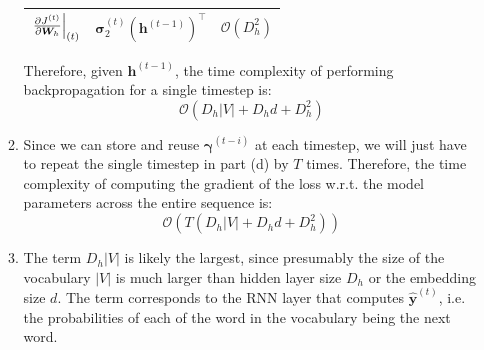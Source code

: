 \documentclass[10pt,reqno]{amsart}
\begin{document}
\begin{enumerate}[topsep=0pt,itemsep=3ex,partopsep=1ex,parsep=1ex]
\begin{enumerate}[itemsep=2ex]
\begin{center}
\begin{tabular}{|c|c|c|}
        $\left. \frac{\partial J^{(t)}}{\partial \bm{W}_h} \right\rvert_{(t)}$ & $\bm{\sigma}^{(t)}_2 \left(\bm{h}^{(t-1)}\right)^\top$ & $\mathcal{O}(D_h^2)$ \\
        \hline
      \end{tabular}
    \end{center}
    \vspace{1mm}
    Therefore, given $\bm{h}^{(t-1)}$, the time complexity of performing backpropagation
    for a single timestep is:
    \begin{equation*}
      \mathcal{O}(D_h |V| + D_h d + D_h^2)
    \end{equation*}
  \item Since we can store and reuse $\bm{\gamma}^{(t-i)}$ at each timestep, 
    we will just have to repeat the single timestep in part (d) by $T$ times. 
    Therefore, the time complexity of computing
    the gradient of the loss w.r.t. the model parameters across 
    the entire sequence is:
    \begin{equation*}
      \mathcal{O}(T(D_h |V| + D_h d + D_h^2))
    \end{equation*}
  \item The term $D_h |V|$ is likely the largest, since presumably the size of the 
    vocabulary $|V|$ is much larger than hidden layer size $D_h$ or the embedding size $d$.
    The term corresponds to the RNN layer 
    that computes $\bm{\hat{y}}^{(t)}$, i.e. the probabilities of each of the word in
    the vocabulary being the next word. 
  \end{enumerate}


\end{enumerate}
\end{document}
